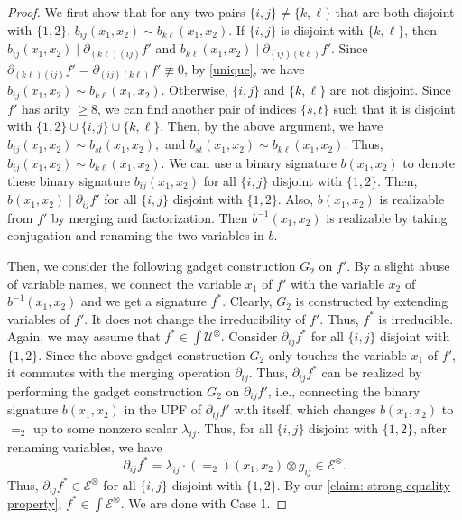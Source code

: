 \begin{proof}
    We first show that for any two pairs $\{i, j\}\neq \{k, \ell\}$ that are both disjoint with $\{1, 2\}$,
    ${b_{ij}}(x_1, x_2)\sim {b_{k\ell}}(x_1, x_2)$. 
    If $\{i, j\}$ is disjoint with $\{k, \ell\}$, then  ${b_{ij}}(x_1, x_2)\mid {\partial}_{(k\ell)(ij)}{f'}$ and ${b_{k\ell}}(x_1, x_2)\mid {\partial}_{(ij)(k\ell)}{f'}$. 
    Since ${\partial}_{(k\ell)(ij)}{f'}={\partial}_{(ij)(k\ell)}{f'}\not\equiv 0$, by \cref{unique}, 
    we have ${b_{ij}}(x_1, x_2)\sim {b_{k\ell}}(x_1, x_2)$. 
    Otherwise, $\{i, j\}$ and $\{k, \ell\}$ are not disjoint. Since ${f'}$ has arity $\geqslant 8$, we can find another pair of indices $\{s, t\}$ such that it is disjoint with $\{1, 2\}\cup \{i, j\} \cup \{k, \ell\}$. 
    Then, by the above argument, we have ${b_{ij}}(x_1, x_2)\sim {b_{st}}(x_1, x_2),$ and  ${b_{st}}(x_1, x_2)\sim {b_{k\ell}}(x_1, x_2).$
    Thus, ${b_{ij}}(x_1, x_2)\sim {b_{k\ell}}(x_1, x_2).$
    We can use a binary signature ${b}(x_1, x_2)$  to denote these binary signature ${b_{ij}}(x_1, x_2)$ for all $\{i, j\}$ disjoint with $\{1, 2\}$. 
    Then, ${b}(x_1, x_2) \mid {\partial}_{ij}{f'}$ for all $\{i, j\}$ disjoint with $\{1, 2\}$. 
    Also,  ${b}(x_1, x_2)$ is realizable  from $ f'$ by merging and factorization.
    Then $b^{-1}(x_1,x_2)$ is realizable by taking conjugation and renaming the two variables in $b.$
    
    Then, we consider the following gadget construction $G_2$ on ${f'}$. 
    By a slight abuse of variable names, 
    we connect the variable $x_1$ of ${f'}$ with the variable $x_2$ of $b^{-1}(x_1, x_2)$ and we get a signature ${f^\ast}$. 
    Clearly, $G_2$ is constructed by extending variables of ${f'}$. It does not change the irreducibility of ${f'}$.
    Thus, ${f^\ast}$ is irreducible.
    Again, we may assume that ${f^\ast}\in {\int}{\mathcal{U}}^{\otimes}$.
    Consider ${\partial}_{ij}{f^\ast}$ for all $\{i, j\}$ disjoint with $\{1, 2\}$. 
    Since the above gadget construction $G_2$ only touches the variable $x_1$ of $f'$, it commutes with the merging operation ${\partial}_{ij}$.
    Thus, ${\partial}_{ij}{f^\ast}$ can be realized by performing the gadget construction $G_2$ on ${\partial}_{ij}{f'}$, i.e.,
    connecting the binary signature $ b(x_1, x_2)$ in the UPF of ${\partial}_{ij}{f'}$ with itself, which changes $b(x_1, x_2)$ to $=_2$ up to some nonzero scalar $\lambda_{ij}$.
    Thus,  for all $\{i, j\}$ disjoint with $\{1, 2\}$, after renaming variables, we have
    $${\partial}_{ij}{f^\ast}=\lambda_{ij}\cdot(=_2)(x_1, x_2) \otimes {g_{ij}}\in {\mathcal{E}}^{\otimes}.$$
        Thus, ${\partial}_{ij}{f^\ast}\in {\mathcal{E}}^{\otimes}$ for all $\{i, j\}$ disjoint with $\{1, 2\}$. By our \cref{claim: strong equality property}, ${f^\ast}\in {\int}{\mathcal{E}}^{\otimes}$.
        We are done with {Case 1.}


\end{proof}
